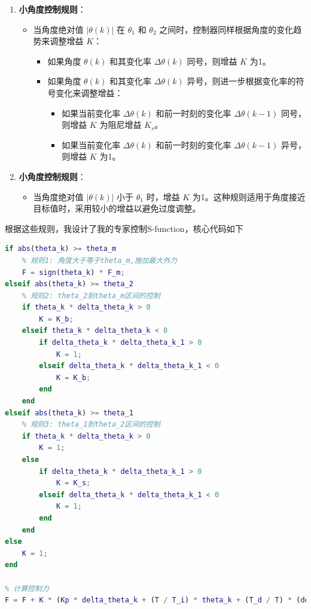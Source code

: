 \documentclass[12pt,a4paper,UTF8]{article}
\begin{document}
\begin{enumerate}
    \item \textbf{小角度控制规则}：
    \begin{itemize}
        \item 当角度绝对值 $|\theta(k)|$ 在 $\theta_1$ 和 $\theta_2$ 之间时，控制器同样根据角度的变化趋势来调整增益 $K$：
        \begin{itemize}
            \item 如果角度 $\theta(k)$ 和其变化率 $\Delta \theta(k)$ 同号，则增益 $K$ 为1。
            \item 如果角度 $\theta(k)$ 和其变化率 $\Delta \theta(k)$ 异号，则进一步根据变化率的符号变化来调整增益：
            \begin{itemize}
                \item 如果当前变化率 $\Delta \theta(k)$ 和前一时刻的变化率 $\Delta \theta(k-1)$ 同号，则增益 $K$ 为阻尼增益 $K_s$。
                \item 如果当前变化率 $\Delta \theta(k)$ 和前一时刻的变化率 $\Delta \theta(k-1)$ 异号，则增益 $K$ 为1。
            \end{itemize}
        \end{itemize}
    \end{itemize}
    
    \item \textbf{小角度控制规则}：
    \begin{itemize}
        \item 当角度绝对值 $|\theta(k)|$ 小于 $\theta_1$ 时，增益 $K$ 为1。这种规则适用于角度接近目标值时，采用较小的增益以避免过度调整。
    \end{itemize}
\end{enumerate}




根据这些规则，我设计了我的专家控制S-function，核心代码如下

\begin{lstlisting}[language=Matlab,caption=专家控制核心代码]
% 专家控制规则
if abs(theta_k) >= theta_m
    % 规则1: 角度大于等于theta_m,施加最大外力
    F = sign(theta_k) * F_m;
elseif abs(theta_k) >= theta_2
    % 规则2: theta_2到theta_m区间的控制
    if theta_k * delta_theta_k > 0
        K = K_b;
    elseif theta_k * delta_theta_k < 0
        if delta_theta_k * delta_theta_k_1 > 0
            K = 1;
        elseif delta_theta_k * delta_theta_k_1 < 0
            K = K_b;
        end
    end
elseif abs(theta_k) >= theta_1
    % 规则3: theta_1到theta_2区间的控制
    if theta_k * delta_theta_k > 0
        K = 1;
    else
        if delta_theta_k * delta_theta_k_1 > 0
            K = K_s;
        elseif delta_theta_k * delta_theta_k_1 < 0
            K = 1;
        end
    end
else
    K = 1;
end

% 计算控制力
F = F + K * (Kp * delta_theta_k + (T / T_i) * theta_k + (T_d / T) * (delta_theta_k - delta_theta_k_1));
\end{lstlisting}
\end{document}
